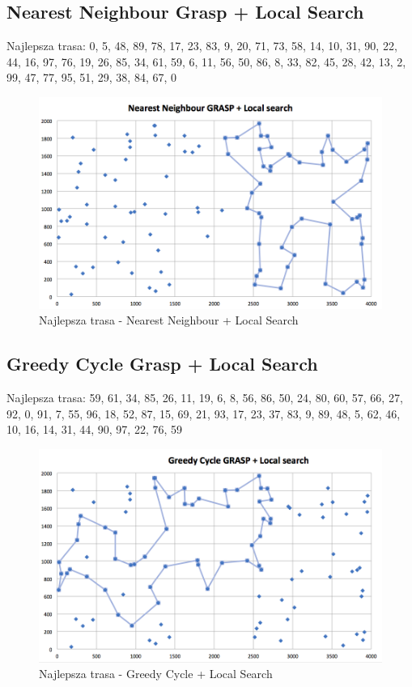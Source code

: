 \documentclass[a4paper 10pt]{article}
\begin{document}
\newpage
\subsection{Nearest Neighbour Grasp + Local Search}
Najlepsza trasa: 0, 5, 48, 89, 78, 17, 23, 83, 9, 20, 71, 73, 58, 14, 10, 31, 90, 22, 44, 16, 97, 76, 19, 26, 85, 34, 61, 59, 6, 11, 56, 50, 86, 8, 33, 82, 45, 28, 42, 13, 2, 99, 47, 77, 95, 51, 29, 38, 84, 67, 0 
\begin{figure} [H]
\centering
\includegraphics[angle=0,width = 1\textwidth, height=!]{images/NNG.png}
\caption{Najlepsza trasa - Nearest Neighbour + Local Search}
\label{Rys. GC}
\end{figure}

\newpage
\subsection{Greedy Cycle Grasp + Local Search}
Najlepsza trasa: 59, 61, 34, 85, 26, 11, 19, 6, 8, 56, 86, 50, 24, 80, 60, 57, 66, 27, 92, 0, 91, 7, 55, 96, 18, 52, 87, 15, 69, 21, 93, 17, 23, 37, 83, 9, 89, 48, 5, 62, 46, 10, 16, 14, 31, 44, 90, 97, 22, 76, 59 
\begin{figure} [H]
\centering
\includegraphics[angle=0,width = 1\textwidth, height=!]{images/GCG.png}
\caption{Najlepsza trasa - Greedy Cycle + Local Search}
\label{Rys. R}
\end{figure}
\end{document}
